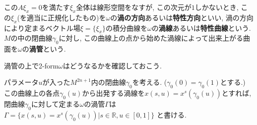 \documentclass[a4paper]{ujarticle}
\numberwithin{equation}{section}
\theoremstyle{definition}
\begin{document}
    この$A \xi_x = 0$を満たす$\xi_x$全体は線形空間をなすが, この次元が$1$しかないとき, 
    この$\xi_x$(を適当に正規化したもの)を$\omega$の\textbf{渦の方向}あるいは\textbf{特性方向}といい,
    渦の方向により定まるベクトル場$\xi = \{\xi_x\}$の積分曲線を$\omega$の\textbf{渦線}あるいは\textbf{特性曲線}という.
    $M$の中の閉曲線$\gamma_0$に対し, この曲線上の点から始めた渦線によって出来上がる曲面を$\omega$の\textbf{渦管}という.

    渦管の上で2-form$\omega$はどうなるかを確認しておこう.

    パラメータ$u$が入った$M^{2n + 1}$内の閉曲線$\gamma_0$を考える. ($\gamma_0(0) = \gamma_0(1)$とする.)
    この曲線上の各点$\gamma_0(u)$から出発する渦線を$x(s, u) = x^{s}(\gamma_0(u))$とすれば,
    閉曲線$\gamma_0$に対して定まる$\omega$の渦管$\Gamma$は
    $\Gamma = \{x(s, u) = x^{s}(\gamma_0(u))| s \in \mathbb{R}, u \in [0,1]\}$
    と書ける.
\end{document}
